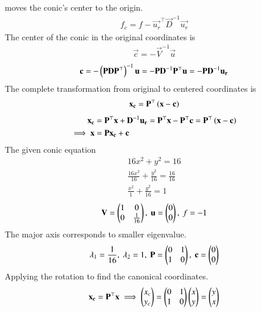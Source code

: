 \documentclass[journal]{IEEEtran}
\begin{document}
moves the conic's center to the origin.
\begin{align}
    f_c = f - \vec{u_r}^\top\vec{D}^{-1}\vec{u_r}
\end{align}
The center of the conic in the original coordinates is 
\begin{align}
    \vec{c} = -\vec{V}^{-1}\vec{u}
\end{align}
\begin{align}
    \mathbf{c} = -\left(\mathbf{P}\mathbf{D}\mathbf{P}^\top\right)^{-1}\mathbf{u} = -\mathbf{P}\mathbf{D}^{-1}\mathbf{P}^\top\mathbf{u} = -\mathbf{P}\mathbf{D}^{-1}\mathbf{u_r}
\end{align}
The complete transformation from original to centered coordinates is 
\begin{align}
    \mathbf{x_c} = \mathbf{P}^\top\left(\mathbf{x}-\mathbf{c}\right)
\end{align}
\begin{align}
    \mathbf{x_c} &= \mathbf{P}^\top\mathbf{x} + \mathbf{D}^{-1}\mathbf{u_r} = \mathbf{P}^\top\mathbf{x} - \mathbf{P}^\top\mathbf{c} = \mathbf{P}^\top\left(\mathbf{x}-\mathbf{c}\right) \\
    \implies \mathbf{x} &= \mathbf{P}\mathbf{x_c} + \mathbf{c} \label{eq:71}
\end{align}
The given conic equation
\begin{align}
    16x^2 + y^2 = 16 \\
    \frac{16x^2}{16} + \frac{y^2}{16} = \frac{16}{16} \\
    \frac{x^2}{1} + \frac{y^2}{16} = 1
\end{align}
\begin{align}
    \mathbf{V} = \begin{pmatrix}1 & 0 \\ 0 & \frac{1}{16}\end{pmatrix}, \text{ } \mathbf{u} = \begin{pmatrix}0 \\ 0\end{pmatrix}, \text{ } f = -1
\end{align}
The major axis corresponds to smaller eigenvalue.
\begin{align}
    \lambda_1 = \frac{1}{16}, \text{ } \lambda_2 = 1, \text{ } \mathbf{P} = \begin{pmatrix}0 & 1 \\ 1 & 0\end{pmatrix}, \text{ } \mathbf{c} = \begin{pmatrix}0 \\ 0\end{pmatrix}
\end{align}
Applying the rotation to find the canonical coordinates.
\begin{align}
    \mathbf{x_c} = \mathbf{P}^\top\mathbf{x} \implies \begin{pmatrix}x_c \\ y_c\end{pmatrix} = \begin{pmatrix}0 & 1 \\ 1 & 0\end{pmatrix}\begin{pmatrix}x \\ y\end{pmatrix} = \begin{pmatrix}y \\ x\end{pmatrix}
\end{align}
\end{document}

